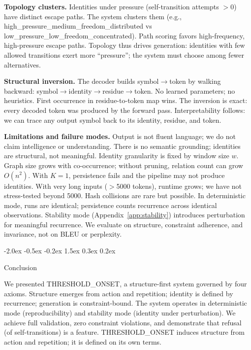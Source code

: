 \documentclass[10pt]{article}
\makeatletter
\renewcommand{\section}{\@startsection{section}{1}{\z@}%
  {-2.0ex \@plus -0.5ex \@minus -0.2ex}%
  {1.5ex \@plus 0.3ex \@minus 0.2ex}%
  {\large\bfseries\raggedright}}
\makeatother
\begin{document}
\textbf{Topology clusters.}
Identities under pressure (self-transition attempts $>0$) have distinct escape paths. The system clusters them (e.g., high\_pressure\_medium\_freedom\_distributed vs low\_pressure\_low\_freedom\_concentrated). Path scoring favors high-frequency, high-pressure escape paths. Topology thus drives generation: identities with few allowed transitions exert more ``pressure''; the system must choose among fewer alternatives.

\textbf{Structural inversion.}
The decoder builds symbol$\rightarrow$token by walking backward: symbol$\rightarrow$identity$\rightarrow$residue$\rightarrow$token. No learned parameters; no heuristics. First occurrence in residue-to-token map wins. The inversion is exact: every decoded token was produced by the forward pass. Interpretability follows: we can trace any output symbol back to its identity, residue, and token.

\textbf{Limitations and failure modes.}
Output is not fluent language; we do not claim intelligence or understanding. There is no semantic grounding; identities are structural, not meaningful. Identity granularity is fixed by window size $w$. Graph size grows with co-occurrence; without pruning, relation count can grow $O(n^2)$. With $K=1$, persistence fails and the pipeline may not produce identities. With very long inputs ($>$5000 tokens), runtime grows; we have not stress-tested beyond 5000. Hash collisions are rare but possible. In deterministic mode, runs are identical; persistence counts recurrence across identical observations. Stability mode (Appendix~\ref{app:stability}) introduces perturbation for meaningful recurrence. We evaluate on structure, constraint adherence, and invariance, not on BLEU or perplexity.

\section{Conclusion}
\label{sec:conclusion}

We presented THRESHOLD\_ONSET, a structure-first system governed by four axioms. Structure emerges from action and repetition; identity is defined by recurrence; generation is constraint-bound. The system operates in deterministic mode (reproducibility) and stability mode (identity under perturbation). We achieve full validation, zero constraint violations, and demonstrate that refusal (of self-transitions) is a feature. THRESHOLD\_ONSET induces structure from action and repetition; it is defined on its own terms.
\end{document}

